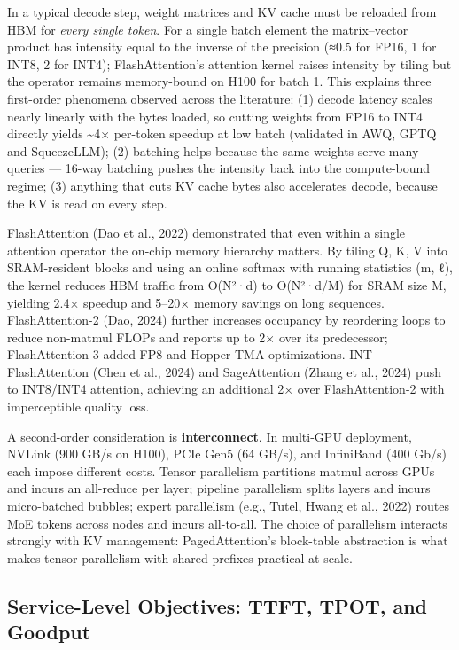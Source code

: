 In a typical decode step, weight matrices and KV cache must be reloaded from HBM for \emph{every single token}. For a single batch element the matrix--vector product has intensity equal to the inverse of the precision (≈0.5 for FP16, 1 for INT8, 2 for INT4); FlashAttention's attention kernel raises intensity by tiling but the operator remains memory-bound on H100 for batch 1. This explains three first-order phenomena observed across the literature: (1) decode latency scales nearly linearly with the bytes loaded, so cutting weights from FP16 to INT4 directly yields \textasciitilde4× per-token speedup at low batch (validated in AWQ, GPTQ and SqueezeLLM); (2) batching helps because the same weights serve many queries --- 16-way batching pushes the intensity back into the compute-bound regime; (3) anything that cuts KV cache bytes also accelerates decode, because the KV is read on every step.

FlashAttention (Dao et al., 2022) demonstrated that even within a single attention operator the on-chip memory hierarchy matters. By tiling Q, K, V into SRAM-resident blocks and using an online softmax with running statistics (m, ℓ), the kernel reduces HBM traffic from O(N²·d) to O(N²·d/M) for SRAM size M, yielding 2.4× speedup and 5--20× memory savings on long sequences. FlashAttention-2 (Dao, 2024) further increases occupancy by reordering loops to reduce non-matmul FLOPs and reports up to 2× over its predecessor; FlashAttention-3 added FP8 and Hopper TMA optimizations. INT-FlashAttention (Chen et al., 2024) and SageAttention (Zhang et al., 2024) push to INT8/INT4 attention, achieving an additional 2× over FlashAttention-2 with imperceptible quality loss.

A second-order consideration is \textbf{interconnect}. In multi-GPU deployment, NVLink (900 GB/s on H100), PCIe Gen5 (64 GB/s), and InfiniBand (400 Gb/s) each impose different costs. Tensor parallelism partitions matmul across GPUs and incurs an all-reduce per layer; pipeline parallelism splits layers and incurs micro-batched bubbles; expert parallelism (e.g., Tutel, Hwang et al., 2022) routes MoE tokens across nodes and incurs all-to-all. The choice of parallelism interacts strongly with KV management: PagedAttention's block-table abstraction is what makes tensor parallelism with shared prefixes practical at scale.

\subsection{Service-Level Objectives: TTFT, TPOT, and Goodput}\label{service-level-objectives-ttft-tpot-and-goodput}

